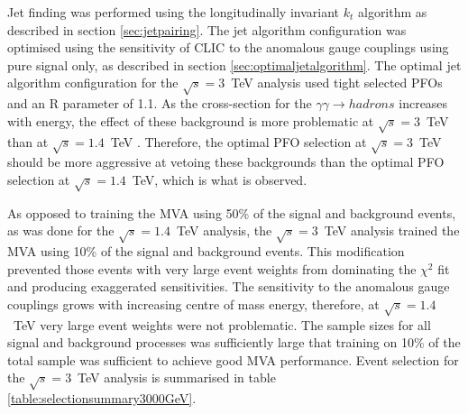 Jet finding was performed using the longitudinally invariant $k_{t}$ algorithm as described in section \ref{sec:jetpairing}.  The jet algorithm configuration was optimised using the sensitivity of CLIC to the anomalous gauge couplings using pure signal only, as described in section \ref{sec:optimaljetalgorithm}.  The optimal jet algorithm configuration for the $\sqrt{s}=3$~TeV analysis used tight selected PFOs and an R parameter of 1.1.  As the cross-section for the $\gamma\gamma \rightarrow hadrons$ increases with energy, the effect of these background is more problematic at $\sqrt{s}=3$~TeV than at $\sqrt{s}=1.4$~TeV \cite{arXiv:1209.4039}.  Therefore, the optimal PFO selection at $\sqrt{s}=3$~TeV should be more aggressive at vetoing these backgrounds than the optimal PFO selection at $\sqrt{s}=1.4$~TeV, which is what is observed.  

As opposed to training the MVA using 50\% of the signal and background events, as was done for the $\sqrt{s}=1.4$~TeV analysis, the $\sqrt{s}=3$~TeV analysis trained the MVA using 10\% of the signal and background events.  This modification prevented those events with very large event weights from dominating the $\chi^{2}$ fit and producing exaggerated sensitivities.  The sensitivity to the anomalous gauge couplings grows with increasing centre of mass energy, therefore, at $\sqrt{s}=1.4$~TeV very large event weights were not problematic.  The sample sizes for all signal and background processes was sufficiently large that training on 10\% of the total sample was sufficient to achieve good MVA performance.  Event selection for the $\sqrt{s}=3$~TeV analysis is summarised in table \ref{table:selectionsummary3000GeV}.

